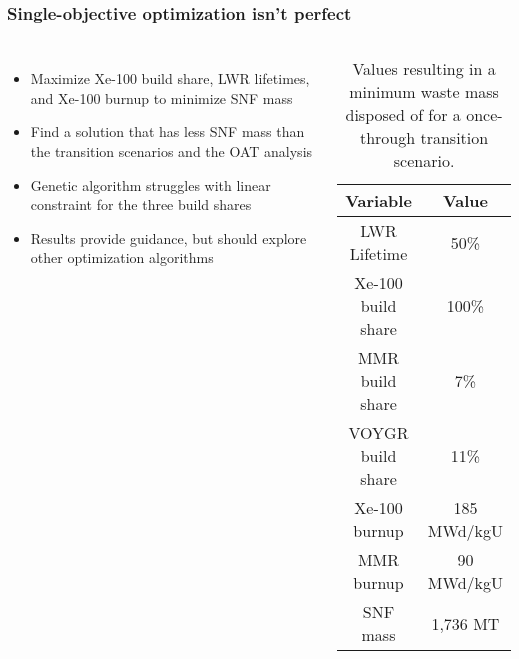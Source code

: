\begin{frame}
    \frametitle{Single-objective optimization isn't perfect}
    \begin{columns}
        \column[t]{5cm}
        \begin{itemize}
            \item Maximize Xe-100 build share, LWR lifetimes,
                  and Xe-100 burnup to minimize \gls{SNF} mass
            \item Find a solution that has less SNF mass than the 
                  transition scenarios and the OAT analysis
            \item<2-> Genetic algorithm struggles with linear constraint for 
                  the three build shares
            \item<3-> Results provide guidance, but should explore 
                  other optimization algorithms
        \end{itemize}

        \column[t]{5.5cm}
        \begin{table}[h!]
            \centering 
            \caption{Values resulting in a minimum waste mass disposed of for 
                      a once-through transition scenario.}
            \label{tab:soga_ot_waste}
            \vspace{-0.5cm}
            \begin{tabular}{c c}
                \hline
                Variable & Value \\
                \hline
                LWR Lifetime & 50\%\\
                Xe-100 build share & 100\%\\
                MMR build share & 7\%\\
                VOYGR build share & 11\%\\
                Xe-100 burnup & 185 MWd/kgU\\
                MMR burnup & 90 MWd/kgU\\
                \hline
                SNF mass & 1,736 MT \\
                \hline
            \end{tabular}
        \end{table}
    \end{columns}
    
\end{frame}